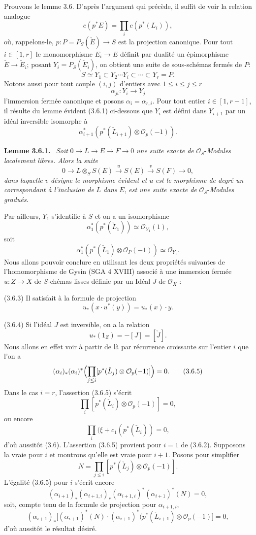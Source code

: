 \documentclass[11pt]{article}
\newenvironment{statement}[1]{\par\medskip\noindent\textbf{#1.}\ }{\par\medskip}
\begin{document}
Prouvons le lemme 3.6. D'après l'argument qui précède, il suffit de voir la relation analogue
\[
c(p^*E)=\prod_i c(p^*(L_i)),
\]
où, rappelons-le, $p:P=P_S(\check E)\to S$ est la projection canonique. Pour tout $i\in[1,r]$ le monomorphisme $E_i\to E$ définit par dualité un épimorphisme $\check E\to\check E_i$; posant $Y_i=P_S(\check E_i)$, on obtient une suite de sous-schémas fermés de $P$:
\[
S\simeq Y_1\subset Y_2\cdots Y_i\subset\cdots\subset Y_r=P.
\]
Notons aussi pour tout couple $(i,j)$ d'entiers avec $1\le i\le j\le r$
\[
\alpha_{ji}:Y_i\to Y_j
\]
l'immersion fermée canonique et posons $\alpha_i=\alpha_{r,i}$. Pour tout entier $i\in[1,r-1]$, il résulte du lemme évident (3.6.1) ci-dessous que $Y_i$ est défini dans $Y_{i+1}$ par un idéal inversible isomorphe à
\[
\alpha_{i+1}^*(p^*(\check L_{i+1})\otimes\mathcal O_p(-1)).
\]

\begin{statement}{Lemme 3.6.1}
\emph{Soit} $0\to L\to E\to F\to0$ \emph{une suite exacte de} $\mathcal O_S$-\emph{Modules localement libres. Alors la suite}
\[
0\to L\otimes_S S(E)\xrightarrow{u}S(E)\xrightarrow{v}S(F)\to0,
\]
\emph{dans laquelle} $v$ \emph{désigne le morphisme évident et} $u$ \emph{est le morphisme de degré un correspondant à l'inclusion de} $L$ \emph{dans} $E$, \emph{est une suite exacte de} $\mathcal O_S$-\emph{Modules gradués}.
\end{statement}

Par
ailleurs, $Y_1$ s'identifie à $S$ et on a un isomorphisme
\[
\alpha_1^*(p^*(\check L_1))\simeq\mathcal O_{Y_1}(1),
\]
soit
\[
\alpha_1^*(p^*(\check L_1)\otimes\mathcal O_P(-1))\simeq \mathcal O_{Y_1}.
\tag{3.6.2.}
\]
Nous allons pouvoir conclure en utilisant les deux propriétés suivantes de l'homomorphisme de Gysin (SGA 4 XVIII) associé à une immersion fermée $u:Z\to X$ de $S$-chémas lisses définie par un Idéal $J$ de $\mathcal O_X$ :

(3.6.3) Il satisfait à la formule de projection
\[
u_*(x\cdot u^*(y))=u_*(x)\cdot y.
\]

(3.6.4) Si l'idéal $J$ est inversible, on a la relation
\[
u_*(1_Z)=-[J]=[\check J].
\]
Nous allons en effet voir à partir de là par récurrence croissante sur l'entier $i$ que l'on a
\[
(\alpha_i)_*(\alpha_i)^*\Bigl(\prod_{j\le i}[p^*(\check L_j)\otimes\mathcal O_p(-1)]\Bigr)=0.
\tag{3.6.5}
\]
Dans le cas $i=r$, l'assertion (3.6.5) s'écrit
\[
\prod_i[p^*(\check L_i)\otimes\mathcal O_p(-1)]=0,
\]
ou encore
\[
\prod_i(\xi+c_1(p^*(\check L_i))=0,
\]
d'où aussitôt (3.6). L'assertion (3.6.5) provient pour $i=1$ de (3.6.2). Supposons la vraie pour $i$ et montrons qu'elle est vraie pour $i+1$. Posons pour simplifier
\[
N=\prod_{j\le i}[p^*(\check L_j)\otimes\mathcal O_p(-1)].
\]
L'égalité (3.6.5) pour $i$ s'écrit encore
\[
(\alpha_{i+1})_*(\alpha_{i+1,i})_*(\alpha_{i+1,i})^*(\alpha_{i+1})^*(N)=0,
\]
soit, compte tenu de la formule de projection pour $\alpha_{i+1,i}$,
\[
(\alpha_{i+1})_*\bigl[(\alpha_{i+1})^*(N)\cdot(\alpha_{i+1})^*(p^*(\check L_{i+1})\otimes\mathcal O_p(-1)\bigr]=0,
\]
d'où aussitôt le
résultat désiré.
\end{document}
